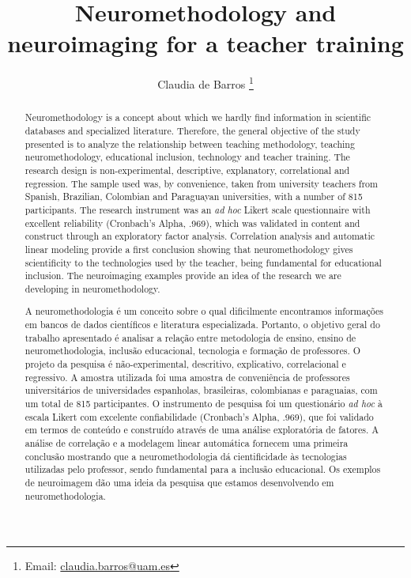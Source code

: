 \documentclass[english]{textolivre}
\title{Neuromethodology and neuroimaging for a teacher training}
\author[1]{Claudia de Barros \orcid{0000-0002-2286-8674} \thanks{Email: \href{mailto:claudia.barros@uam.es}{claudia.barros@uam.es}}}
\affil[1]{Universidad Autónoma de Madrid, Facultad de Formación de Profesorado y de la Educación, Departamento Pedagogía, Madrid, España.}
\begin{document}
\maketitle

\begin{polyabstract}
\begin{abstract}
Neuromethodology is a concept about which we hardly find information in scientific databases and specialized literature. Therefore, the general objective of the study presented is to analyze the relationship between teaching methodology, teaching neuromethodology, educational inclusion, technology and teacher training. The research design is non-experimental, descriptive, explanatory, correlational and regression. The sample used was, by convenience, taken from university teachers from Spanish, Brazilian, Colombian and Paraguayan universities, with a number of 815 participants. The research instrument was an \textit{ad hoc} Likert scale questionnaire with excellent reliability (Cronbach's Alpha, .969), which was validated in content and construct through an exploratory factor analysis. Correlation analysis and automatic linear modeling provide a first conclusion showing that neuromethodology gives scientificity to the technologies used by the teacher, being fundamental for educational inclusion. The neuroimaging examples provide an idea of the research we are developing in neuromethodology.

\end{abstract}

\begin{portuguese}
\begin{abstract}
A neuromethodologia é um conceito sobre o qual dificilmente encontramos informações em bancos de dados científicos e literatura especializada. Portanto, o objetivo geral do trabalho apresentado é analisar a relação entre metodologia de ensino, ensino de neuromethodologia, inclusão educacional, tecnologia e formação de professores. O projeto da pesquisa é não-experimental, descritivo, explicativo, correlacional e regressivo. A amostra utilizada foi uma amostra de conveniência de professores universitários de universidades espanholas, brasileiras, colombianas e paraguaias, com um total de 815 participantes. O instrumento de pesquisa foi um questionário \textit{ad hoc} à escala Likert com excelente confiabilidade (Cronbach's Alpha, .969), que foi validado em termos de conteúdo e construído através de uma análise exploratória de fatores. A análise de correlação e a modelagem linear automática fornecem uma primeira conclusão mostrando que a neuromethodologia dá cientificidade às tecnologias utilizadas pelo professor, sendo fundamental para a inclusão educacional. Os exemplos de neuroimagem dão uma ideia da pesquisa que estamos desenvolvendo em neuromethodologia.


\end{abstract}
\end{portuguese}
\end{polyabstract}
\end{document}
